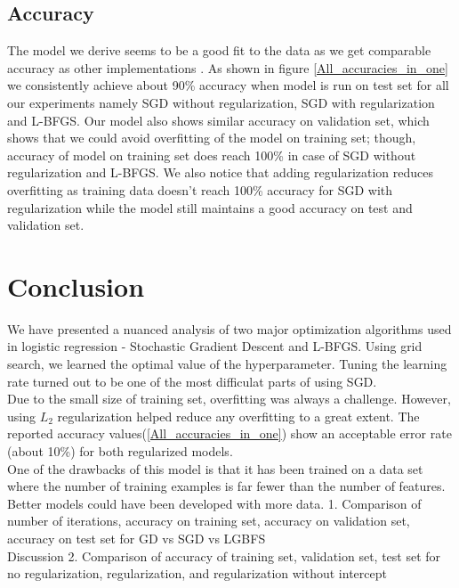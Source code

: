 \documentclass{acm_proc_article-sp}
\begin{document}
\subsection{Accuracy}
The model we derive seems to be a good fit to the data as we get comparable accuracy as other implementations \cite{mpComp}. As shown in figure \ref{All_accuracies_in_one} we consistently achieve about 90\% accuracy when model is run on test set for all our experiments namely SGD without regularization, SGD with regularization and L-BFGS. Our model also shows similar accuracy on validation set, which shows that we could avoid overfitting of the model on training set; though, accuracy of model on training set does reach 100\% in case of SGD without regularization and L-BFGS. We also notice that  adding regularization reduces overfitting as training data doesn't reach 100\% accuracy for SGD with regularization while the model still maintains a good accuracy on test and validation set.

\section{Conclusion}
We have presented a nuanced analysis of two major optimization algorithms used in logistic regression  - Stochastic Gradient Descent and L-BFGS. Using grid search, we learned the optimal value of the hyperparameter. Tuning the learning rate turned out to be one of the most difficulat parts of using SGD.\\
Due to the small size of training set, overfitting was always a challenge. However, using $L_{2}$ regularization helped reduce any overfitting to a great extent. The reported accuracy values(\ref{All_accuracies_in_one}) show an acceptable error rate (about 10\%) for both regularized models.
\\
One of the drawbacks of this model is that it has been trained on a data set where the number of training examples is far fewer than the number of features. Better models could have been developed with more data.
1. Comparison of number of iterations, accuracy on training set, accuracy on validation set, accuracy on test set for GD vs SGD vs LGBFS\\
Discussion
2. Comparison of accuracy of training set, validation set, test set for no regularization, regularization, and regularization without intercept\\
%

 
\end{document}
